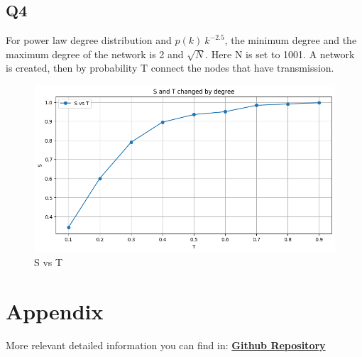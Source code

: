 \documentclass{article}
\begin{document}
	\subsection*{Q4}
	For power law degree distribution and $p(k) ~ k^{-2.5}$, the minimum degree and the maximum degree of the network is 2 and $\sqrt{N}$. Here N is set to 1001. A network is created, then by probability T connect the nodes that have transmission.
	\begin{figure}[H]
		\centering
		\includegraphics[scale=0.5]{P2Q4.png}
		\caption{S vs T}
	\end{figure}
	
	\section*{Appendix}
	More relevant detailed information you can find in: 
	\href{https://github.com/DingYX0731/Selected-Topics-in-Frontiers-of-Statistics}{\textbf{Github Repository}}
	
	
\end{document}
